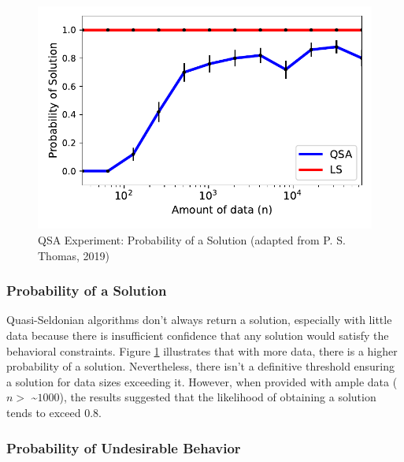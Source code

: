 \documentclass[12pt, twoside]{amherstthesis}
\begin{document}
\begin{figure}

{\centering \includegraphics{Dasha-Asienga_StatThesis_files/figure-latex/fig5-5} 

}

\caption{QSA Experiment: Probability of a Solution (adapted from P. S. Thomas, 2019)}\label{fig:fig5}
\end{figure}
\hypertarget{probability-of-a-solution}{%
\subsubsection{Probability of a Solution}\label{probability-of-a-solution}}

Quasi-Seldonian algorithms don't always return a solution, especially with little data because there is insufficient confidence that any solution would satisfy the behavioral constraints. Figure \ref{fig:fig5} illustrates that with more data, there is a higher probability of a solution. Nevertheless, there isn't a definitive threshold ensuring a solution for data sizes exceeding it. However, when provided with ample data (\(n >\) \textasciitilde{}\(1000\)), the results suggested that the likelihood of obtaining a solution tends to exceed 0.8.

\hypertarget{probability-of-undesirable-behavior}{%
\subsubsection{Probability of Undesirable Behavior}\label{probability-of-undesirable-behavior}}
\end{document}
